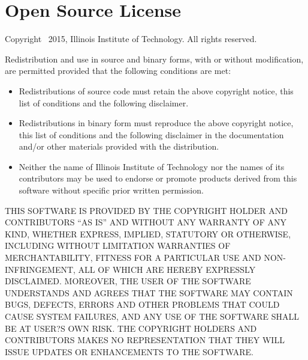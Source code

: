 \documentclass[10pt]{article}
\begin{document}
\maketitle






\newpage
\section*{Open Source License}


 
\bigskip
\noindent
Copyright \textcopyright\ 2015, Illinois Institute of Technology. All rights reserved.
 
Redistribution and use in source and binary forms, with or without 
modification, are permitted provided that the following conditions are 
met:

\begin{itemize}
\item  Redistributions of source code must retain the above copyright 
    notice, this list of conditions and the following disclaimer.
    
\item Redistributions in binary form must reproduce the above copyright 
    notice, this list of conditions and the following disclaimer in the 
    documentation and/or other materials provided with the distribution.
    
\item Neither the name of Illinois Institute of Technology nor the names of
    its contributors may be used to endorse or promote products derived 
    from this software without specific prior written permission.
\end{itemize}
 
THIS SOFTWARE IS PROVIDED BY THE COPYRIGHT HOLDER AND CONTRIBUTORS 
``AS IS'' AND WITHOUT ANY WARRANTY OF ANY KIND, WHETHER EXPRESS, IMPLIED, 
STATUTORY OR OTHERWISE, INCLUDING WITHOUT LIMITATION WARRANTIES OF 
MERCHANTABILITY, FITNESS FOR A PARTICULAR USE AND NON-INFRINGEMENT, ALL 
OF WHICH ARE HEREBY EXPRESSLY DISCLAIMED. MOREOVER, THE USER OF THE 
SOFTWARE UNDERSTANDS AND AGREES THAT THE SOFTWARE MAY CONTAIN BUGS, 
DEFECTS, ERRORS AND OTHER PROBLEMS THAT COULD CAUSE SYSTEM FAILURES, AND 
ANY USE OF THE SOFTWARE SHALL BE AT USER?S OWN RISK. THE COPYRIGHT 
HOLDERS AND CONTRIBUTORS MAKES NO REPRESENTATION THAT THEY WILL ISSUE 
UPDATES OR ENHANCEMENTS TO THE SOFTWARE.  
 
\bigskip
 
\end{document}
